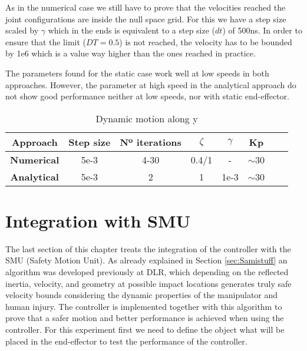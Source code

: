 As in the numerical case we still have to prove that the velocities reached the joint configurations are inside the null space grid. For this we have a step size scaled by $\gamma$ which in the ends is equivalent to a step size ($dt$) of 500ns. In order to ensure that the limit ($DT=0.5$) is not reached, the velocity has to be bounded by 1e6 which is a value way higher than the ones reached in practice.


The parameters found for the static case work well at low speeds in both approaches. However,  the parameter at high speed in the analytical approach do not show good performance neither at low speeds, nor with static end-effector.

\begin{table}[]
	\centering
	\caption{Dynamic motion along y}
	\label{table:dynamic_opt_values}
	\begin{tabular}{|c|c|c|c|c|c|c|c|}
		\hline
		\textbf{Approach}   & \textbf{Step size} & \textbf{Nº iterations} & \textbf{$\zeta$}  &  \textbf{$\gamma$} & \textbf{Kp}  \\ \hline
		\textbf{Numerical}  &  5e-3       & 4-30                          & 0.4/1                  & -         &  ${\sim}$30                          \\  \textbf{Analytical} &   5e-3       & 2                             &  1                  & 1e-3         & ${\sim}$30                         \\ \hline
		
               
	\end{tabular}
\end{table}




\section{Integration with SMU}

The last section of this chapter treats the integration of the controller with the SMU (Safety Motion Unit). As already explained in Section \ref{sec:Samistuff} an algorithm was developed previously at DLR, which depending on the reflected inertia, velocity, and geometry at possible impact locations generates truly safe velocity bounds considering the dynamic properties of the manipulator and human injury. The controller is implemented together with this algorithm to prove that a safer motion and better performance is achieved when using the controller.
For this experiment first we need to define the object what will be placed in the end-effector to test the performance of the controller.


